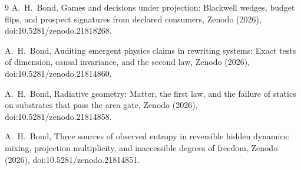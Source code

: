 \documentclass[aps,pre,reprint,nofootinbib,floatfix]{revtex4-2}
\begin{document}
\begin{thebibliography}{9}
A.~H.~Bond,
Games and decisions under projection: Blackwell wedges, budget
flips, and prospect signatures from declared consumers,
Zenodo (2026), doi:10.5281/zenodo.21818268.

A.~H.~Bond,
Auditing emergent physics claims in rewriting systems: Exact tests
of dimension, causal invariance, and the second law,
Zenodo (2026), doi:10.5281/zenodo.21814860.

A.~H.~Bond,
Radiative geometry: Matter, the first law, and the failure of
statics on substrates that pass the area gate,
Zenodo (2026), doi:10.5281/zenodo.21814858.

A.~H.~Bond,
Three sources of observed entropy in reversible hidden dynamics:
mixing, projection multiplicity, and inaccessible degrees of
freedom,
Zenodo (2026), doi:10.5281/zenodo.21814851.

\end{thebibliography}
\end{document}
